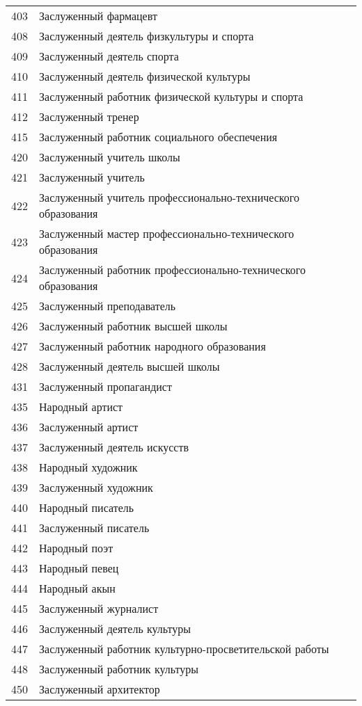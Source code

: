 \documentclass[10pt, a4paper, titlepage]{article}
\begin{document}
\begin{xtabular}{rp{.38\textwidth}}
    403 & Заслуженный фармацевт \\
    408 & Заслуженный деятель физкультуры и спорта \\
    409 & Заслуженный деятель спорта \\
    410 & Заслуженный деятель физической культуры \\
    411 & Заслуженный работник физической культуры и спорта \\
    412 & Заслуженный тренер \\
    415 & Заслуженный работник социального обеспечения \\
    420 & Заслуженный учитель школы \\
    421 & Заслуженный учитель \\
    422 & Заслуженный учитель профессионально-технического образования \\
    423 & Заслуженный мастер профессионально-технического образования \\
    424 & Заслуженный работник профессионально-технического образования \\
    425 & Заслуженный преподаватель \\
    426 & Заслуженный работник высшей школы \\
    427 & Заслуженный работник народного образования \\
    428 & Заслуженный деятель высшей школы \\
    431 & Заслуженный пропагандист \\
    435 & Народный артист \\
    436 & Заслуженный артист \\
    437 & Заслуженный деятель искусств \\
    438 & Народный художник \\
    439 & Заслуженный художник \\
    440 & Народный писатель \\
    441 & Заслуженный писатель \\
    442 & Народный поэт \\
    443 & Народный певец \\
    444 & Народный акын \\
    445 & Заслуженный журналист \\
    446 & Заслуженный деятель культуры \\
    447 & Заслуженный работник культурно-просветительской работы \\
    448 & Заслуженный работник культуры \\
    450 & Заслуженный архитектор \\

\end{xtabular}
\end{document}
